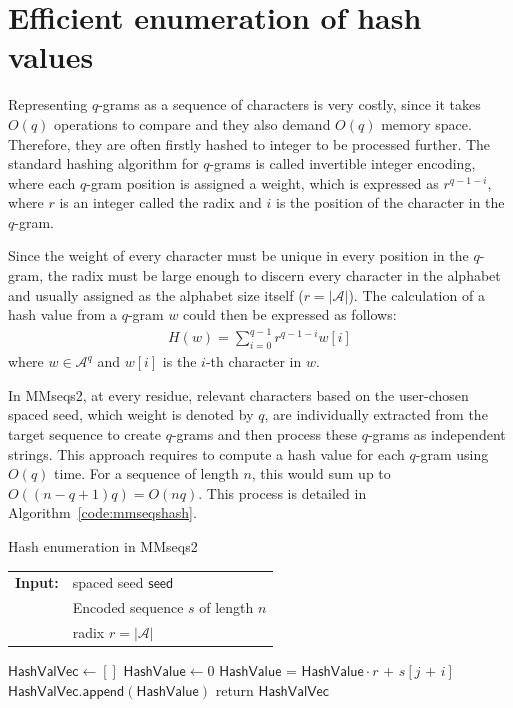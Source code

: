 \documentclass[twoside,a4paper,bsc]{master}
\newcommand{\Qgram}[1]{\(#1\)-gram}
\newcommand{\Seed}[0]{\mathsf{seed}}
\newcommand{\Span}[0]{\mathsf{span}}
\newcommand{\Append}[0]{\mathsf{append}}
\newcommand{\HashValue}[0]{\mathsf{HashValue}}
\newcommand{\HashValVec}[0]{\mathsf{HashValVec}}
\newcommand{\Alpha}[0]{\mathcal{A}}
\begin{document}
\section{Efficient enumeration of hash values}
Representing \Qgram{q}s as a sequence of characters is very costly, since it
takes \(O(q)\) operations to compare and they also demand \(O(q)\) memory space.
Therefore, they are often firstly hashed to integer to be processed
further. The standard hashing algorithm for \Qgram{q}s is called invertible
integer encoding, where each \Qgram{q} position is assigned a weight, which is expressed
as \(r^{q-1-i}\), where \(r\) is an integer called the radix and \(i\) is the 
position of the character in the \Qgram{q}.

Since the weight of every character must be unique in every position in the
\Qgram{q}, the radix must be large enough to discern every character in
the alphabet and usually assigned as the alphabet size itself
(\(r=|\Alpha|\)).
The calculation of a hash value from a \Qgram{q} \(w\) could then be
expressed as follows:
\begin{align}
H(w) = \sum_{i=0}^{q-1}r^{q-1-i}w[i]\label{DefineHfunction}
\end{align}
where \(w\in\Alpha^q\) and \(w[i]\) is the \(i\)-th character in \(w\).

In MMseqs2, at every residue, relevant characters based on the user-chosen
spaced seed, which weight is denoted by \(q\), are individually
extracted from the target sequence to create \Qgram{q}s and then process
these \Qgram{q}s as independent strings. This approach requires to compute
a hash value for each \Qgram{q} using \(O(q)\) time. For a sequence of
length
\(n\), this would sum up to \(O((n-q+1)q)=O(nq)\). This process is detailed
in
Algorithm~\ref{code:mmseqshash}.
\begin{algorithm}[t]
\caption{Hash enumeration in MMseqs2}
\label{code:mmseqshash}
\begin{tabular}{@{}l@{~}l}
\textbf{Input:}
&spaced seed \(\Seed\)\\
&Encoded sequence \(s\) of length \(n\)\\
&radix \(r = |\Alpha|\)
\end{tabular}
\begin{algorithmic}
\State \(\HashValVec\gets []\)
\State \(\HashValue \gets 0\)
\For{\(i \in [0,\Seed.\Span)\)}
\If{\(\Seed[i]\)}
\State \(\HashValue\text{ = }\HashValue\cdot r\text{ + }s[j\text{ + }i]\)
\EndIf
\EndFor
\State \(\HashValVec .\Append(\HashValue)\)
\EndFor
\State return \(\HashValVec\)
\end{algorithmic}
\end{algorithm}
\end{document}
